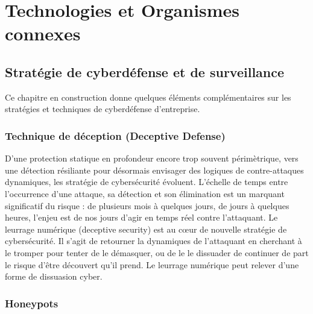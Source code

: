 
\section{Technologies et Organismes connexes}

\subsection{Stratégie de cyberdéfense et de surveillance}

Ce chapitre en construction donne quelques éléments complémentaires sur les stratégies et techniques de cyberdéfense d'entreprise. 


\subsubsection{Technique de déception (Deceptive Defense)}

 D'une protection statique en profondeur encore trop souvent périmètrique, vers une détection résiliante pour désormais envisager des logiques de contre-attaques dynamiques, les stratégie de cybersécurité évoluent. L'échelle de temps entre l'occurrence d'une attaque, sa détection et son élimination est un marquant significatif du risque : de plusieurs mois à quelques jours,  de jours à quelques heures, l'enjeu est  de nos jours  d'agir en temps réel contre l'attaquant. 
 Le leurrage numérique (deceptive security) est au cœur de nouvelle stratégie de  cybersécurité. Il s'agit de retourner la dynamiques  de l'attaquant en cherchant à le tromper pour tenter de le démasquer, ou de le le dissuader de continuer de part le risque d'être découvert qu'il prend. Le leurrage numérique peut relever d'une forme de dissuasion cyber.

\subsubsection{Honeypots}


